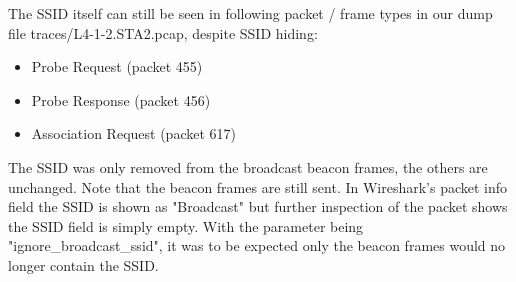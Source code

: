 The SSID itself can still be seen in following packet / frame types in our dump file traces/L4-1-2.STA2.pcap, despite SSID hiding:
\begin{itemize}
\item Probe Request (packet 455)
\item Probe Response (packet 456)
\item Association Request (packet 617)
\end{itemize}
The SSID was only removed from the broadcast beacon frames, the others are unchanged. Note that the beacon frames are still sent. In Wireshark's packet info field the SSID is shown as "Broadcast" but further inspection of the packet shows the SSID field is simply empty.
With the parameter being "ignore\_broadcast\_ssid", it was to be expected only the beacon frames would no longer contain the SSID.
